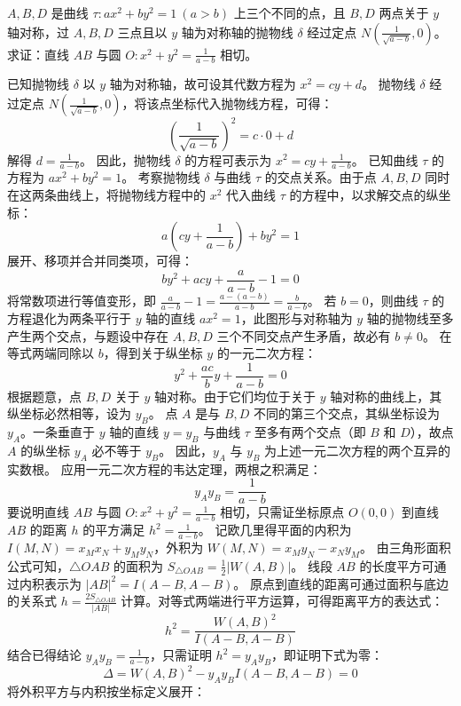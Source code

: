 \begin{example}
$A,B,D$ 是曲线 $\tau: ax^2 + by^2 = 1\ (a > b)$ 上三个不同的点，且 $B,D$ 两点关于 $y$ 轴对称，过 $A,B,D$ 三点且以 $y$ 轴为对称轴的抛物线 $\delta$ 经过定点 $N\left(\frac{1}{\sqrt{a - b}}, 0\right)$。求证：直线 $AB$ 与圆 $O: x^2 + y^2 = \frac{1}{a - b}$ 相切。
\end{example}
\begin{solution}
已知抛物线 $\delta$ 以 $y$ 轴为对称轴，故可设其代数方程为 $x^2 = cy + d$。
抛物线 $\delta$ 经过定点 $N\left(\frac{1}{\sqrt{a - b}}, 0\right)$，将该点坐标代入抛物线方程，可得：
\[ \left(\frac{1}{\sqrt{a - b}}\right)^2 = c \cdot 0 + d \]
解得 $d = \frac{1}{a - b}$。
因此，抛物线 $\delta$ 的方程可表示为 $x^2 = cy + \frac{1}{a - b}$。
已知曲线 $\tau$ 的方程为 $ax^2 + by^2 = 1$。
考察抛物线 $\delta$ 与曲线 $\tau$ 的交点关系。由于点 $A, B, D$ 同时在这两条曲线上，将抛物线方程中的 $x^2$ 代入曲线 $\tau$ 的方程中，以求解交点的纵坐标：
\[ a\left(cy + \frac{1}{a - b}\right) + by^2 = 1 \]
展开、移项并合并同类项，可得：
\[ by^2 + acy + \frac{a}{a - b} - 1 = 0 \]
将常数项进行等值变形，即 $\frac{a}{a - b} - 1 = \frac{a - (a - b)}{a - b} = \frac{b}{a - b}$。
若 $b = 0$，则曲线 $\tau$ 的方程退化为两条平行于 $y$ 轴的直线 $ax^2 = 1$，此图形与对称轴为 $y$ 轴的抛物线至多产生两个交点，与题设中存在 $A, B, D$ 三个不同交点产生矛盾，故必有 $b \neq 0$。
在等式两端同除以 $b$，得到关于纵坐标 $y$ 的一元二次方程：
\[ y^2 + \frac{ac}{b}y + \frac{1}{a - b} = 0 \]
根据题意，点 $B, D$ 关于 $y$ 轴对称。由于它们均位于关于 $y$ 轴对称的曲线上，其纵坐标必然相等，设为 $y_B$。
点 $A$ 是与 $B, D$ 不同的第三个交点，其纵坐标设为 $y_A$。一条垂直于 $y$ 轴的直线 $y = y_B$ 与曲线 $\tau$ 至多有两个交点（即 $B$ 和 $D$），故点 $A$ 的纵坐标 $y_A$ 必不等于 $y_B$。
因此，$y_A$ 与 $y_B$ 为上述一元二次方程的两个互异的实数根。
应用一元二次方程的韦达定理，两根之积满足：
\[ y_A y_B = \frac{1}{a - b} \]
要说明直线 $AB$ 与圆 $O: x^2 + y^2 = \frac{1}{a - b}$ 相切，只需证坐标原点 $O(0,0)$ 到直线 $AB$ 的距离 $h$ 的平方满足 $h^2 = \frac{1}{a - b}$。
记欧几里得平面的内积为 $I(M,N) = x_M x_N + y_M y_N$，外积为 $W(M,N) = x_M y_N - x_N y_M$。
由三角形面积公式可知，$\triangle OAB$ 的面积为 $S_{\triangle OAB} = \frac{1}{2} |W(A,B)|$。
线段 $AB$ 的长度平方可通过内积表示为 $|AB|^2 = I(A-B, A-B)$。
原点到直线的距离可通过面积与底边的关系式 $h = \frac{2S_{\triangle OAB}}{|AB|}$ 计算。对等式两端进行平方运算，可得距离平方的表达式：
\[ h^2 = \frac{W(A,B)^2}{I(A-B, A-B)} \]
结合已得结论 $y_A y_B = \frac{1}{a - b}$，只需证明 $h^2 = y_A y_B$，即证明下式为零：
\[ \Delta = W(A,B)^2 - y_A y_B I(A-B, A-B) = 0 \]
将外积平方与内积按坐标定义展开：

\end{solution}
